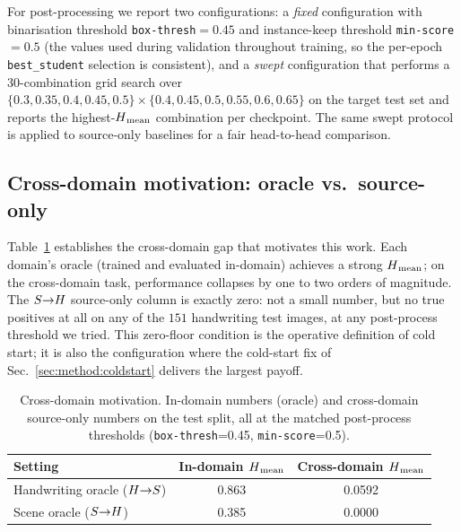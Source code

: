 For post-processing we report two configurations: a \emph{fixed}
configuration with binarisation threshold \texttt{box-thresh}$=0.45$
and instance-keep threshold \texttt{min-score}$=0.5$ (the values used
during validation throughout training, so the per-epoch
\texttt{best\_student} selection is consistent), and a \emph{swept}
configuration that performs a $30$-combination grid search over
$\{0.3, 0.35, 0.4, 0.45, 0.5\} \times \{0.4, 0.45, 0.5, 0.55, 0.6, 0.65\}$
on the target test set and reports the highest-$H\textsubscript{mean}$ combination
per checkpoint. The same swept protocol is applied to source-only
baselines for a fair head-to-head comparison.

\subsection{Cross-domain motivation: oracle vs.\ source-only}
\label{sec:exp:motivation}

Table~\ref{tab:motivation} establishes the cross-domain gap that
motivates this work. Each domain's oracle (trained and evaluated
in-domain) achieves a strong $H\textsubscript{mean}$; on the cross-domain task,
performance collapses by one to two orders of magnitude. The
$S{\rightarrow}H$ source-only column is exactly zero: not a small number,
but no true positives at all on any of the $151$ handwriting test
images, at any post-process threshold we tried. This zero-floor
condition is the operative definition of cold start; it is also the
configuration where the cold-start fix of Sec.~\ref{sec:method:coldstart}
delivers the largest payoff.

\begin{table}[t]
\centering
\caption{Cross-domain motivation. In-domain numbers (oracle) and
cross-domain source-only numbers on the test split, all at the matched
post-process thresholds (\texttt{box-thresh}=0.45, \texttt{min-score}=0.5).}
\label{tab:motivation}
\begin{tabular}{lcc}
\toprule
Setting & In-domain $H\textsubscript{mean}$ & Cross-domain $H\textsubscript{mean}$ \\
\midrule
Handwriting oracle ($H{\rightarrow}S$) & 0.863 & 0.0592 \\
Scene oracle      ($S{\rightarrow}H$)     & 0.385 & 0.0000 \\
\bottomrule
\end{tabular}
\end{table}

